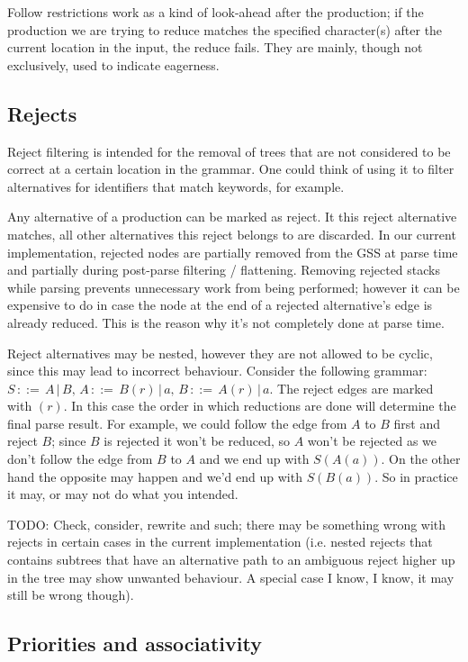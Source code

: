 \documentclass[a4paper,10pt]{article}
\begin{document}
Follow restrictions work as a kind of look-ahead after the production; if the production we are trying to reduce matches the specified character(s) after the current location in the input, the reduce fails. They are mainly, though not exclusively, used to indicate eagerness.

\subsection{Rejects}

Reject filtering is intended for the removal of trees that are not considered to be correct at a certain location in the grammar. One could think of using it to filter alternatives for identifiers that match keywords, for example.

Any alternative of a production can be marked as reject. It this reject alternative matches, all other alternatives this reject belongs to are discarded. In our current implementation, rejected nodes are partially removed from the GSS at parse time and partially during post-parse filtering / flattening. Removing rejected stacks while parsing prevents unnecessary work from being performed; however it can be expensive to do in case the node at the end of a rejected alternative's edge is already reduced. This is the reason why it's not completely done at parse time.

Reject alternatives may be nested, however they are not allowed to be cyclic, since this may lead to incorrect behaviour. Consider the following grammar: $S\,::=\,A\,|\,B,\,A\,::=\,B(r)\,|\,a,\,B\,::=\,A(r)\,|\,a$. The reject edges are marked with $(r)$. In this case the order in which reductions are done will determine the final parse result. For example, we could follow the edge from $A$ to $B$ first and reject $B$; since $B$ is rejected it won't be reduced, so $A$ won't be rejected as we don't follow the edge from $B$ to $A$ and we end up with $S(A(a))$. On the other hand the opposite may happen and we'd end up with $S(B(a))$. So in practice it may, or may not do what you intended.

TODO: Check, consider, rewrite and such; there may be something wrong with rejects in certain cases in the current implementation (i.e. nested rejects that contains subtrees that have an alternative path to an ambiguous reject higher up in the tree may show unwanted behaviour. A special case I know, I know, it may still be wrong though).

\subsection{Priorities and associativity}
\end{document}
